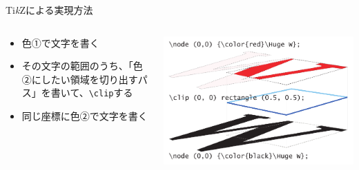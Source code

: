 \documentclass[unicode,14pt]{beamer}
\newcommand{\TikZ}{Ti\textit{k}Z}
\begin{document}
\begin{frame}[t]{\TikZ{}による実現方法}
  \sffamily
  \begin{columns}[t]
    \begin{column}{.5\textwidth}
  \begin{itemize}
\item 色①で文字を書く
\item その文字の範囲のうち、「色②にしたい領域を切り出すパス」を書いて、\texttt{\textbackslash{}clip}する
\item 同じ座標に色②で文字を書く
  \end{itemize}
    \end{column}
    \begin{column}{.5\textwidth}
  \begin{center}
    \includegraphics[width=\textwidth]{figures/w-clip.pdf}
  \end{center}
    \end{column}
  \end{columns}
\end{frame}
\end{document}
